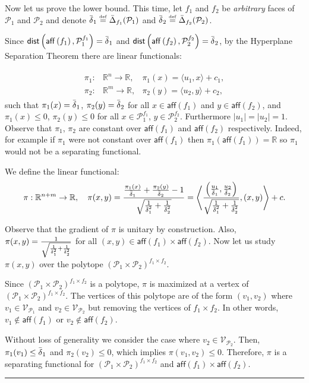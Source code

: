 \documentclass[twoside]{article}
\newcommand{\R}{\mathbb{R}}
\newcommand{\jmlrBlackBox}{\rule{1.5ex}{1.5ex}}
\newcommand{\jmlrQED}{\hfill\jmlrBlackBox\par\bigskip}
\providecommand{\proofname}{Proof}
\renewenvironment{proof}{\par\noindent{\bfseries\upshape \proofname\ }}{\jmlrQED}
\newcommand{\mP}{\mathcal{P}}
\newcommand{\verts}[1]{\mathcal{V}_{#1}}
\newcommand{\aff}[1]{\mathsf{aff}\left(#1\right)}
\newcommand{\dist}[1]{\mathsf{dist}\left(#1\right)}
\newcommand{\defi}{\stackrel{\mathrm{\scriptscriptstyle def}}{=}}
\begin{document}
\begin{proof}
  Now let us prove the lower bound. This time, let $f_1$ and $f_2$ be \emph{arbitrary} faces of $\mP_1$ and $\mP_2$ and denote $\what_1 \defi \whatface{f_1}{\mP_1}$ and $\what_2 \defi \whatface{f_2}{\mP_2}$.

  Since $\dist{\aff{f_1},\mP_1^{f_1}} = \what_1$ and $\dist{\aff{f_2},\mP_2^{f_2}} = \what_2$, by the Hyperplane Separation Theorem there are linear functionals:

  \begin{align*}
      \begin{aligned}
    \pi_1:&\R^n \to \R, &\pi_1(x) = \langle u_1, x \rangle + c_1,      \\
    \pi_2:&\R^m \to \R, &\pi_2(y) = \langle u_2, y \rangle + c_2,
      \end{aligned}
  \end{align*} 
  such that $\pi_1(x) = \operatorname{\bar{\delta}}_1$, $\pi_2(y) = \operatorname{\bar{\delta}}_2$ for all $x\in \aff{f_1}$ and $y\in \aff{f_2}$, and $\pi_1(x) \leq 0$, $\pi_2(y) \leq 0$ for all $x\in \mP_1^{f_1}$, $y\in \mP_2^{f_2}$. Furthermore $|u_1|=|u_2|=1$. Observe that $\pi_1$, $\pi_2$ are constant over $\aff{f_1}$ and $\aff{f_2}$ respectively. Indeed, for example if $\pi_1$ were not constant over $\aff{f_1}$ then $\pi_1(\aff{f_1})=\R$ so $\pi_1$ would not be a separating functional.

  We define the linear functional:
  \begin{align*}
    \pi: \R^{n+m} \to \R, \quad \pi(x,y) = \frac{\frac{\pi_1(x)}{\what_1}+\frac{\pi_2(y)}{\what_2}-1}{\sqrt{\frac{1}{\what_1^2}+\frac{1}{\what_2^2}}}= \left\langle \frac{\left(\frac{u_1}{\what_1}, \frac{u_2}{\what_2}\right)}{\sqrt{\frac{1}{\what_1^2}+\frac{1}{\what_2^2}}}, (x,y) \right\rangle + c.
  \end{align*}

  Observe that the gradient of $\pi$ is unitary by construction. Also, $\pi(x,y)=\frac{1}{\sqrt{\frac{1}{\operatorname{\bar{\delta}}_1^2}+\frac{1}{\operatorname{\bar{\delta}}_2^2}}}$ for all $(x,y)\in \aff{f_1}\times \aff{f_2}$. Now let us study $\pi(x,y)$ over the polytope $\left(\mP_1\times \mP_2\right)^{f_1\times f_2}$.

  Since $\left(\mP_1\times \mP_2\right)^{f_1\times f_2}$ is a polytope, $\pi$ is maximized at a vertex of $\left(\mP_1\times \mP_2\right)^{f_1\times f_2}$. The vertices of this polytope are of the form $(v_1,v_2)$ where $v_1\in \verts{\mP_1}$ and $v_2\in \verts{\mP_2}$ but removing the vertices of $f_1\times f_2$. In other words, $v_1\not\in \aff{f_1}$ or $v_2\not\in \aff{f_2}$.

  Without loss of generality we consider the case where $v_2\in \verts{\mP_2}$. Then, $\pi_1(v_1)\leq \operatorname{\bar{\delta}}_1$ and $\pi_2(v_2)\leq 0$, which implies $\pi(v_1,v_2)\leq 0$. Therefore, $\pi$ is a separating functional for $\left(\mP_1\times \mP_2\right)^{f_1\times f_2}$ and $\aff{f_1}\times \aff{f_2}$.
  

\end{proof}
\end{document}
